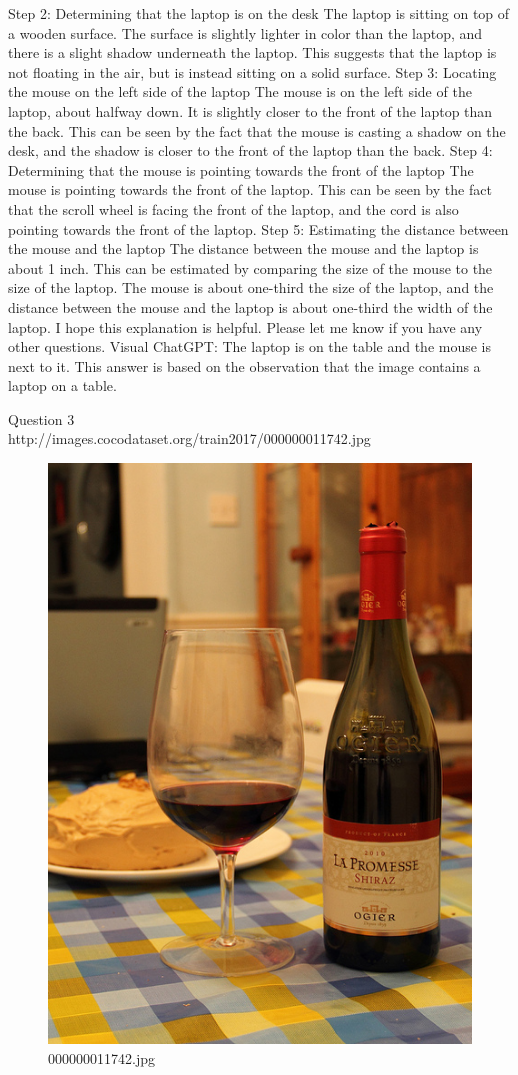 \begin{enumerate}
{        Step 2: Determining that the laptop is on the desk
        The laptop is sitting on top of a wooden surface. The surface is slightly lighter in color than the laptop, and there is a slight shadow underneath the laptop. This suggests that the laptop is not floating in the air, but is instead sitting on a solid surface.
        Step 3: Locating the mouse on the left side of the laptop
        The mouse is on the left side of the laptop, about halfway down. It is slightly closer to the front of the laptop than the back. This can be seen by the fact that the mouse is casting a shadow on the desk, and the shadow is closer to the front of the laptop than the back.
        Step 4: Determining that the mouse is pointing towards the front of the laptop
        The mouse is pointing towards the front of the laptop. This can be seen by the fact that the scroll wheel is facing the front of the laptop, and the cord is also pointing towards the front of the laptop.
        Step 5: Estimating the distance between the mouse and the laptop
        The distance between the mouse and the laptop is about 1 inch. This can be estimated by comparing the size of the mouse to the size of the laptop. The mouse is about one-third the size of the laptop, and the distance between the mouse and the laptop is about one-third the width of the laptop. I hope this explanation is helpful. Please let me know if you have any other questions.}
        \subitem Visual ChatGPT: The laptop is on the table and the mouse is next to it. This answer is based on the observation that the image contains a laptop on a table.
    \end{enumerate}
Question 3\\
http://images.cocodataset.org/train2017/000000011742.jpg
    \begin{figure}[h]
        \centering
        \includegraphics[width=0.8\linewidth]{../image set/easy/000000011742.jpg}
        \caption{000000011742.jpg}
    \end{figure}
